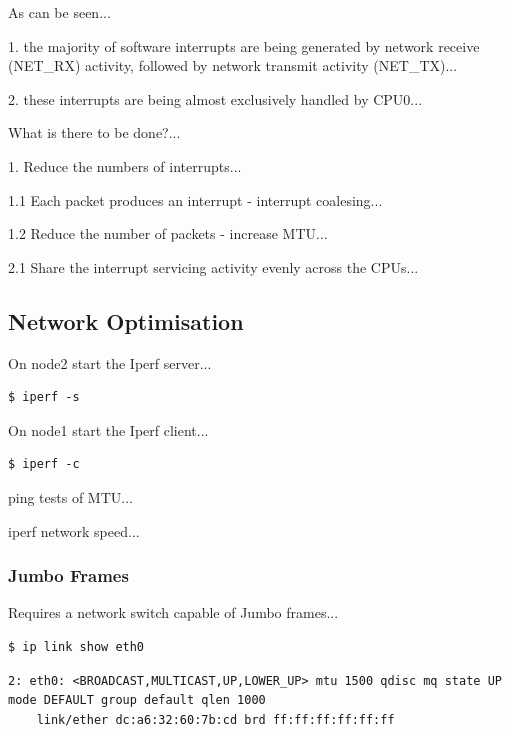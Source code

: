 \documentclass{report}
\begin{document}
As can be seen...

1. the majority of software interrupts are being generated by network receive (NET\_RX) activity, followed by network transmit activity (NET\_TX)...

2. these interrupts are being almost exclusively handled by CPU0...

What is there to be done?...

1. Reduce the numbers of interrupts...

1.1 Each packet produces an interrupt - interrupt coalesing...

1.2 Reduce the number of packets - increase MTU...

2.1 Share the interrupt servicing activity evenly across the CPUs...


%
%
\subsection{Network Optimisation}

On node2 start the Iperf server...

\lstset{style=type}
\begin{lstlisting}
$ iperf -s
\end{lstlisting}

On node1 start the Iperf client...

\lstset{style=type}
\begin{lstlisting}
$ iperf -c
\end{lstlisting}

ping tests of MTU...




iperf network speed...





\subsubsection{Jumbo Frames}

Requires a network switch capable of Jumbo frames...


\lstset{style=type}
\begin{lstlisting}
$ ip link show eth0
\end{lstlisting}


\lstset{style=type}
\begin{lstlisting}
2: eth0: <BROADCAST,MULTICAST,UP,LOWER_UP> mtu 1500 qdisc mq state UP mode DEFAULT group default qlen 1000
    link/ether dc:a6:32:60:7b:cd brd ff:ff:ff:ff:ff:ff
\end{lstlisting}
\end{document}
